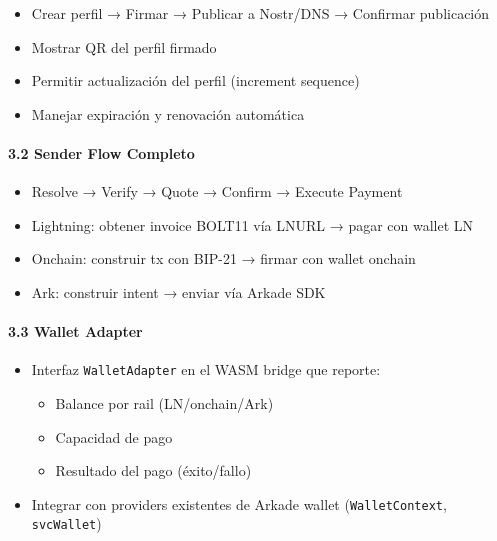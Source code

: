 \documentclass[
]{article}
\providecommand{\tightlist}{%
  \setlength{\itemsep}{0pt}\setlength{\parskip}{0pt}}
\begin{document}
\begin{itemize}
\tightlist
\item[$\square$]
  Crear perfil → Firmar → Publicar a Nostr/DNS → Confirmar publicación
\item[$\square$]
  Mostrar QR del perfil firmado
\item[$\square$]
  Permitir actualización del perfil (increment sequence)
\item[$\square$]
  Manejar expiración y renovación automática
\end{itemize}

\hypertarget{sender-flow-completo}{%
\paragraph{3.2 Sender Flow Completo}\label{sender-flow-completo}}

\begin{itemize}
\tightlist
\item[$\square$]
  Resolve → Verify → Quote → Confirm → Execute Payment
\item[$\square$]
  Lightning: obtener invoice BOLT11 vía LNURL → pagar con wallet LN
\item[$\square$]
  Onchain: construir tx con BIP-21 → firmar con wallet onchain
\item[$\square$]
  Ark: construir intent → enviar vía Arkade SDK
\end{itemize}

\hypertarget{wallet-adapter}{%
\paragraph{3.3 Wallet Adapter}\label{wallet-adapter}}

\begin{itemize}
\tightlist
\item[$\square$]
  Interfaz \texttt{WalletAdapter} en el WASM bridge que reporte:

  \begin{itemize}
  \tightlist
  \item[$\square$]
    Balance por rail (LN/onchain/Ark)
  \item[$\square$]
    Capacidad de pago
  \item[$\square$]
    Resultado del pago (éxito/fallo)
  \end{itemize}
\item[$\square$]
  Integrar con providers existentes de Arkade wallet
  (\texttt{WalletContext}, \texttt{svcWallet})
\end{itemize}
\end{document}
